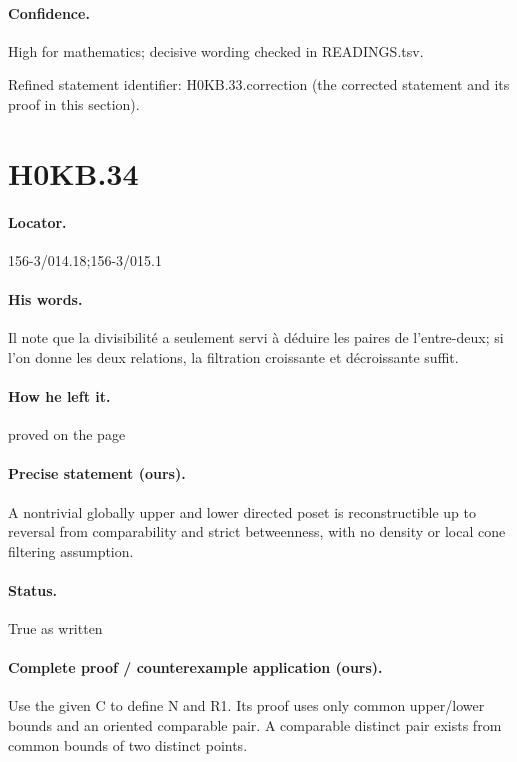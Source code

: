 \paragraph{Confidence.} High for mathematics; decisive wording checked in READINGS.tsv.

\noindent Refined statement identifier: H0KB.33.correction (the corrected statement and its proof in this section).

\section*{H0KB.34}\label{statement:H0KB.34}
\paragraph{Locator.} 156-3/014.18;156-3/015.1

\paragraph{His words.} Il note que la divisibilité a seulement servi à déduire les paires de l’entre-deux; si l’on donne les deux relations, la filtration croissante et décroissante suffit.

\paragraph{How he left it.} proved on the page

\paragraph{Precise statement (ours).} A nontrivial globally upper and lower directed poset is reconstructible up to reversal from comparability and strict betweenness, with no density or local cone filtering assumption.

\paragraph{Status.} True as written

\paragraph{Complete proof / counterexample application (ours).} Use the given C to define N and R1. Its proof uses only common upper/lower bounds and an oriented comparable pair. A comparable distinct pair exists from common bounds of two distinct points.


